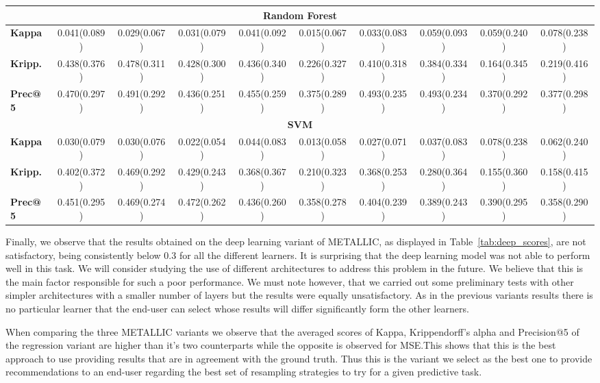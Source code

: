 \documentclass{article}
\begin{document}
\begin{sidewaystable}[!htbp]
\begin{tabular}{@{}lccccccccc@{}}
\midrule
\multicolumn{10}{c}{\textbf{Random Forest}}\\
\midrule
\textbf{Kappa} & 0.041(0.089) & 0.029(0.067) & 0.031(0.079) & 0.041(0.092) & 0.015(0.067) & 0.033(0.083) & 0.059(0.093) & 0.059(0.240) & 0.078(0.238) \\
\textbf{Kripp.} & 0.438(0.376) & 0.478(0.311) & 0.428(0.300) & 0.436(0.340) & 0.226(0.327) & 0.410(0.318) & 0.384(0.334) & 0.164(0.345) & 0.219(0.416) \\
\textbf{Prec@5} & 0.470(0.297) & 0.491(0.292) & 0.436(0.251) & 0.455(0.259) & 0.375(0.289) & 0.493(0.235) & 0.493(0.234) & 0.370(0.292) & 0.377(0.298) \\
\midrule
\multicolumn{10}{c}{\textbf{SVM}}\\
\midrule
\textbf{Kappa} & 0.030(0.079) & 0.030(0.076) & 0.022(0.054) & 0.044(0.083) & 0.013(0.058) & 0.027(0.071) & 0.037(0.083) & 0.078(0.238) & 0.062(0.240) \\
\textbf{Kripp.} & 0.402(0.372) & 0.469(0.292) & 0.429(0.243) & 0.368(0.367) & 0.210(0.323) & 0.368(0.253) & 0.280(0.364) & 0.155(0.360) & 0.158(0.415) \\
\textbf{Prec@5} & 0.451(0.295) & 0.469(0.274) & 0.472(0.262) & 0.436(0.260) & 0.358(0.278) & 0.404(0.239) & 0.389(0.243) & 0.390(0.295) & 0.358(0.290) \\
\bottomrule
\end{tabular}
\end{sidewaystable}

Finally, we observe that the results obtained on the deep learning variant of METALLIC, as displayed in Table~\autoref{tab:deep_scores}, are not satisfactory, being consistently below 0.3 for all the different learners. It is surprising that the deep learning model was not able to perform well in this task. We will consider studying the use of different architectures to address this problem in the future. We believe that this is the main factor responsible for such a poor performance. We must note however, that we carried out some preliminary tests with other simpler architectures with a smaller number of layers but the results were equally unsatisfactory. As in the previous variants results there is no particular learner that the end-user can select whose results will differ significantly form the other learners.

When comparing the three METALLIC variants we observe that the averaged scores of Kappa, Krippendorff's alpha and Precision@5 of the regression variant are higher than it's two counterparts while the opposite is observed for MSE.\@ This shows that this is the best approach to use providing results that are in agreement with the ground truth. Thus this is the variant we select as the best one to provide recommendations to an end-user regarding the best set of resampling strategies to try for a given predictive task.
\end{document}
